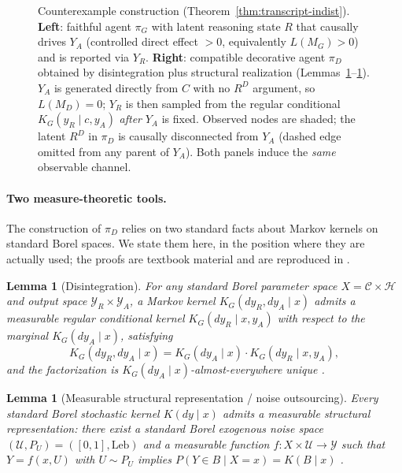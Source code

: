 \documentclass{article}
\theoremstyle{plain}
\newtheorem{lemma}[theorem]{Lemma}
\theoremstyle{definition}
\theoremstyle{remark}
\newcommand{\C}{\mathcal{C}}
\newcommand{\Y}{\mathcal{Y}}
\newcommand{\YR}{\mathcal{Y}_R}
\newcommand{\YA}{\mathcal{Y}_A}
\newcommand{\Hist}{\mathcal{H}}
\begin{document}
\begin{figure}[ht]
\caption{Counterexample construction (Theorem~\ref{thm:transcript-indist}).
\textbf{Left}: faithful agent $\pi_G$ with latent reasoning state $R$ that
causally drives $Y_A$ (controlled direct effect $> 0$, equivalently $L(M_G) > 0$) and is reported via $Y_R$.
\textbf{Right}: compatible decorative agent $\pi_D$ obtained by disintegration
plus structural realization (Lemmas~\ref{lem:A}--\ref{lem:B}). $Y_A$ is
generated directly from $C$ with no $R^D$ argument, so $L(M_D) = 0$;
$Y_R$ is then sampled from the regular conditional $K_G(y_R \mid c, y_A)$
\emph{after} $Y_A$ is fixed. Observed nodes are shaded; the latent $R^D$ in
$\pi_D$ is causally disconnected from $Y_A$ (dashed edge omitted from any
parent of $Y_A$). Both panels induce the \emph{same} observable channel.}
\label{fig:counterexample}
\end{figure}

\paragraph{Two measure-theoretic tools.}
The construction of $\pi_D$ relies on two standard facts about Markov kernels
on standard Borel spaces. We state them here, in the position where they are
actually used; the proofs are textbook material and are reproduced in
.

\begin{lemma}[Disintegration]\label{lem:A}
For any standard Borel parameter space $X = \C \times \Hist$ and output space
$\YR \times \YA$, a Markov kernel $K_G(dy_R, dy_A \mid x)$ admits a measurable
regular conditional kernel $K_G(dy_R \mid x, y_A)$ with respect to the marginal
$K_G(dy_A \mid x)$, satisfying
\[
K_G(dy_R, dy_A \mid x) = K_G(dy_A \mid x) \cdot K_G(dy_R \mid x, y_A),
\]
and the factorization is $K_G(dy_A \mid x)$-almost-everywhere unique
\citep[Theorem~8.5]{kallenberg2021}.
\end{lemma}

\begin{lemma}[Measurable structural representation / noise outsourcing]\label{lem:B}
Every standard Borel stochastic kernel $K(dy \mid x)$ admits a measurable
structural representation: there exist a standard Borel exogenous noise space
$(\mathcal{U}, P_U) = ([0,1], \mathrm{Leb})$ and a measurable function
$f : X \times \mathcal{U} \to \Y$ such that $Y = f(x, U)$ with $U \sim P_U$
implies $P(Y \in B \mid X = x) = K(B \mid x)$
\citep[Theorem~6.10 and Lemma~4.22]{kallenberg2021}.
\end{lemma}
\end{document}
